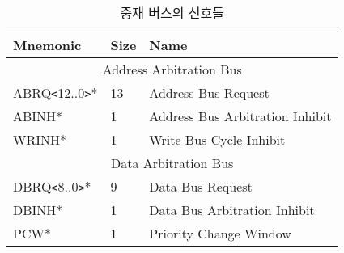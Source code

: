 %
\begin{table}[htbp]
\caption{중재 버스의 신호들}\label{table:arb-signal}
   \begin{center}
   \begin{tabular}{|l|l|l|} \hline
      Mnemonic & Size & Name \\ \hline \hline
      \multicolumn{3}{|c|}{Address Arbitration Bus} \\ \hline
      ABRQ{\tt <}12..0{\tt >}* & 13 & Address Bus Request \\
      ABINH*                   & 1 & Address Bus Arbitration Inhibit \\
      WRINH*                   & 1 & Write Bus Cycle Inhibit \\ \hline
      \multicolumn{3}{|c|}{Data Arbitration Bus} \\ \hline
      DBRQ{\tt <}8..0{\tt >}*  & 9 & Data Bus Request \\
      DBINH*                   & 1 & Data Bus Arbitration Inhibit \\
      PCW*                     & 1 & Priority Change Window \\ \hline
   \end{tabular}
   \end{center}
\end{table}
%
